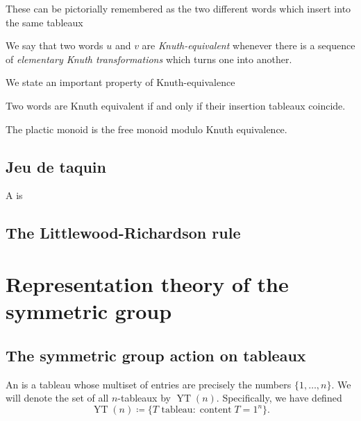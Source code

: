 \documentclass{article}
\DeclareMathOperator{\content}{content}
\DeclareMathOperator{\YT}{YT}
\begin{document}
These can be pictorially remembered as the two different words which insert into the same tableaux

\begin{definition}
    We say that two words $u$ and $v$ are \textit{Knuth-equivalent} whenever there is a sequence of \textit{elementary Knuth transformations} which turns one into another.
\end{definition}

We state an important property of Knuth-equivalence

\begin{theorem}
    Two words are Knuth equivalent if and only if their insertion tableaux coincide.
\end{theorem}

\begin{corollary}
    The plactic monoid is the free monoid modulo Knuth equivalence.
\end{corollary}


\subsection{Jeu de taquin}

\begin{definition}
    A  is
\end{definition}

\subsection{The Littlewood-Richardson rule}

\section{Representation theory of the symmetric group}

\subsection{The symmetric group action on tableaux}

\begin{definition}
    An  is a tableau whose multiset of entries are precisely the numbers $\{1,\ldots,n\}$.
    We will denote the set of all $n$-tableaux by $\YT(n)$.
    Specifically, we have defined
    \[
        \YT(n)
        \coloneq
        \{\text{$T$ tableau} : \content T = 1^n\}.
    \]
\end{definition}
\end{document}
